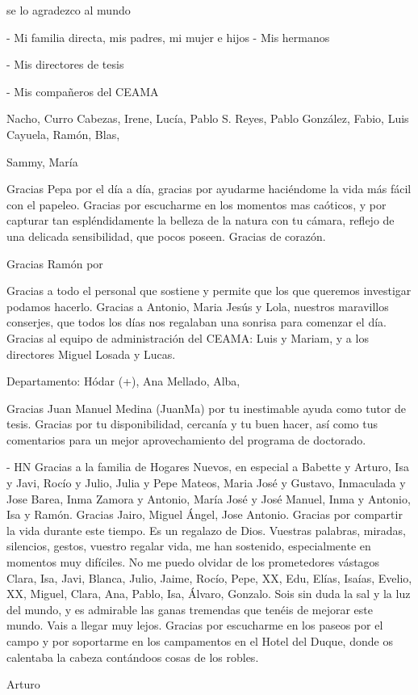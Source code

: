 %
\label{sec:acknowledgement}

se lo agradezco al mundo 


- Mi familia directa, mis padres, mi mujer e hijos
- Mis hermanos 

- Mis directores de tesis 

- Mis compañeros del CEAMA 

Nacho, Curro Cabezas, Irene, Lucía, Pablo S. Reyes, Pablo González, Fabio, Luis Cayuela, 
Ramón, Blas, 


Sammy, María 

Gracias Pepa por el día a día, gracias por ayudarme haciéndome la vida más fácil con el papeleo. Gracias por escucharme en los momentos mas caóticos, y por capturar tan espléndidamente la belleza de la natura con tu cámara, reflejo de una delicada sensibilidad, que pocos poseen. Gracias de corazón. 

Gracias Ramón por 

Gracias a todo el personal que sostiene y permite que los que queremos investigar podamos hacerlo. Gracias a Antonio, Maria Jesús y Lola, nuestros maravillos conserjes, que todos los días nos regalaban una sonrisa para comenzar el día. Gracias al equipo de administración del CEAMA: Luis y Mariam, y a los directores Miguel Losada y Lucas. 


Departamento: 
Hódar (+), Ana Mellado, Alba, 

Gracias Juan Manuel Medina (JuanMa) por tu inestimable ayuda como tutor de tesis. Gracias por tu disponibilidad, cercanía y tu buen hacer, así como tus comentarios para un mejor aprovechamiento del programa de doctorado. 


- HN 
Gracias a la familia de Hogares Nuevos, en especial a Babette y Arturo, Isa y Javi, Rocío y Julio, Julia y Pepe Mateos, Maria José y Gustavo, Inmaculada y Jose Barea, Inma Zamora y Antonio, María José y José Manuel, Inma y Antonio, Isa y Ramón. Gracias Jairo, Miguel Ángel, Jose Antonio. Gracias por compartir la vida durante este tiempo. Es un regalazo de Dios. Vuestras palabras, miradas, silencios, gestos, vuestro regalar vida, me han sostenido, especialmente en momentos muy difíciles. No me puedo olvidar de los prometedores vástagos Clara, Isa, Javi, Blanca, Julio, Jaime, Rocío, Pepe, XX, Edu, Elías, Isaías, Evelio, XX, Miguel, Clara, Ana, Pablo, Isa, Álvaro, Gonzalo. Sois sin duda la sal y la luz del mundo, y es admirable las ganas tremendas que tenéis de mejorar este mundo. Vais a llegar muy lejos. Gracias por escucharme en los paseos por el campo y por soportarme en los campamentos en el Hotel del Duque, donde os calentaba la cabeza contándoos cosas de los robles.  



Arturo
